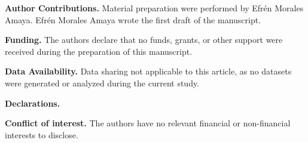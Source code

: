 \documentclass[12pt]{amsart}
\begin{document}
  
   
            \textbf{Author Contributions.} Material preparation were performed by Efr\'en Morales 
           Amaya. Efr\'en Morales Amaya wrote the first draft of the manuscript.  
           
          \textbf{Funding.} The authors declare that no funds, grants, or other support were received 
          during the preparation of this manuscript.

          \textbf{Data Availability.} Data sharing not applicable to this article, as no datasets were 
          generated or analyzed during the current study.
          
          \textbf{Declarations.}
          
           \textbf{Conflict of interest.} The authors have no relevant financial or non-financial interests to disclose.
\end{document}
